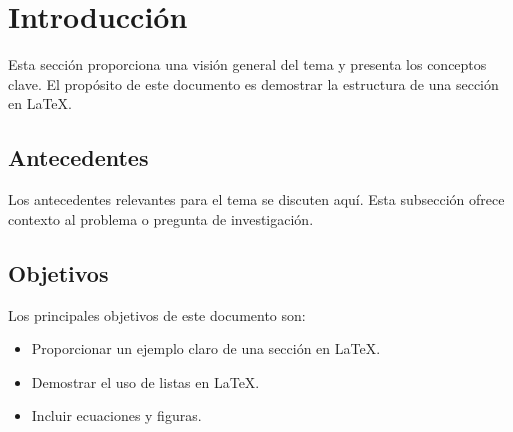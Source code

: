 \section{Introducción}

Esta sección proporciona una visión general del tema y presenta los conceptos clave. El propósito de este documento es demostrar la estructura de una sección en LaTeX.

\subsection{Antecedentes}

Los antecedentes relevantes para el tema se discuten aquí. Esta subsección ofrece contexto al problema o pregunta de investigación.

\subsection{Objetivos}

Los principales objetivos de este documento son:
\begin{itemize}
    \item Proporcionar un ejemplo claro de una sección en LaTeX.
    \item Demostrar el uso de listas en LaTeX.
    \item Incluir ecuaciones y figuras.
\end{itemize}

